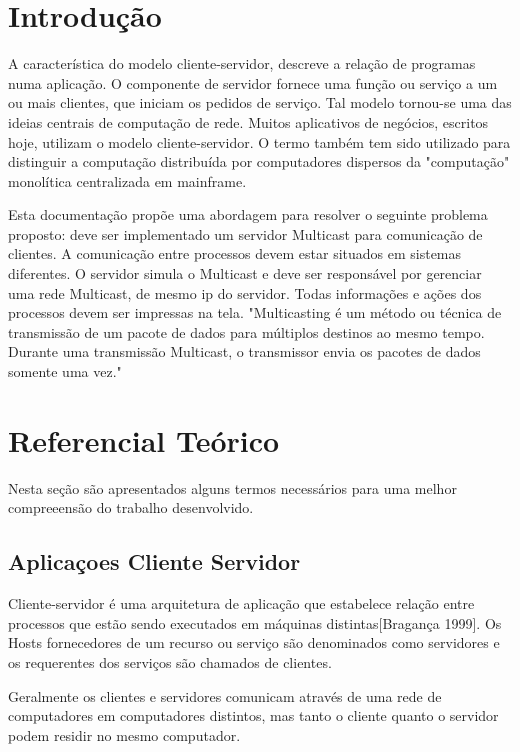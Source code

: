 \documentclass[brazil, a4paper,12pt]{article}
\begin{document}


\section{Introdução}

A característica do modelo cliente-servidor, descreve a relação de programas numa aplicação.  O componente de servidor fornece uma função ou serviço a um ou mais clientes, que iniciam os pedidos de serviço. Tal modelo tornou-se uma das ideias centrais de computação de rede. Muitos aplicativos de negócios, escritos hoje, utilizam o modelo cliente-servidor. O termo também tem sido utilizado para distinguir a computação distribuída por computadores dispersos da "computação" monolítica centralizada em mainframe.

Esta documentação propõe uma abordagem para resolver o seguinte problema proposto: deve ser implementado um servidor Multicast para comunicação de clientes. A comunicação entre processos devem estar situados em sistemas diferentes. O servidor simula o Multicast e deve ser responsável por gerenciar uma rede Multicast, de mesmo ip do servidor. Todas informações e ações dos processos devem ser impressas na tela.
"Multicasting é um método ou técnica de transmissão de um pacote de dados para múltiplos destinos ao mesmo tempo. Durante uma transmissão Multicast, o transmissor envia os pacotes de dados somente uma vez."

\section{Referencial Teórico}

Nesta seção são apresentados alguns termos necessários para uma melhor compreeensão do trabalho desenvolvido.

\subsection{Aplicaçoes Cliente Servidor}

Cliente-servidor é uma arquitetura de aplicação que estabelece relação entre processos que estão sendo executados em máquinas distintas[Bragança 1999].
Os Hosts fornecedores de um recurso ou serviço são denominados como servidores e os requerentes dos serviços são chamados de clientes.

Geralmente os clientes e servidores comunicam através de uma rede de computadores em computadores distintos, mas tanto o cliente quanto o servidor podem residir no mesmo computador.
\end{document}
